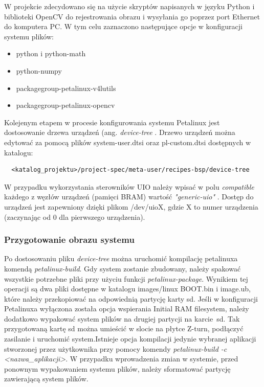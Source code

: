 W projekcie zdecydowano się na użycie skryptów napisanych w języku Python i biblioteki OpenCV do rejestrowania obrazu i 
wysyłania go poprzez port Ethernet do komputera PC. W tym celu zaznaczono następujące opcje w konfiguracji systemu 
plików:  

\begin{itemize}
  \item python i python-math
  \item python-numpy
  \item packagegroup-petalinux-v4lutils 
  \item packagegroup-petalinux-opencv
\end{itemize}


Kolejenym etapem w procesie konfigurowania systemu Petalinux jest dostosowanie drzewa urządzeń (ang. \emph{device-tree}
. Drzewo urządzeń można edytować za pomocą plików system-user.dtsi oraz pl-custom.dtsi dostępnych w katalogu:

\begin{verbatim}
  <katalog_projektu>/project-spec/meta-user/recipes-bsp/device-tree
\end{verbatim}
W przypadku wykorzystania sterowników UIO należy wpisać w polu \emph{compatible} każdego z węzłów urządzeń (pamięci 
BRAM) wartość \emph{"generic-uio"} \cite{uio-device-tree}. Dostęp do urządzeń jest zapewniony dzięki plikom /dev/uioX, 
gdzie X to numer urządzenia (zaczynając od 0 dla pierwszego urządzenia).

\subsubsection{Przygotowanie obrazu systemu}

Po dostosowaniu pliku \emph{device-tree} można uruchomić kompilację petalinuxa komendą \emph{petalinux-build}.
Gdy system zostanie zbudowany, należy spakować wszystkie potrzebne pliki przy użyciu funkcji \emph{petalinux-package}.
Wynikiem tej operacji są dwa pliki dostępne w katalogu images/linux BOOT.bin i image.ub, które należy przekopiować na
odpowiednią partycję karty sd. Jeśli w konfiguracji Petalinuxa wyłączona została opcja wspierania Initial RAM
filesystem, należy dodatkowo wypakować system plików na drugiej partycji na karcie~sd. Tak przygotowaną kartę sd można
umieścić w slocie na płytce Z-turn, podłączyć zasilanie i uruchomić system.Istnieje opcja kompilacji jedynie wybranej 
aplikacji stworzonej przez użytkownika przy pomocy komendy \emph{petalinux-build -c <nazwa\_aplikacji>}. W przypadku 
wprowadzenia zmian w systemie, przed ponownym wypakowaniem systemu plików, należy sformatować partycję zawierającą 
system plików. 

